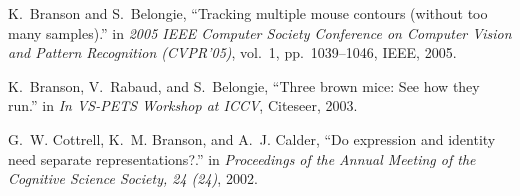 \begin{cvenum}
\item K.~Branson and S.~Belongie, ``Tracking multiple mouse contours (without too
  many samples).'' in {\em 2005 IEEE Computer Society Conference on Computer
  Vision and Pattern Recognition (CVPR'05)}, vol.~1, pp.~1039--1046, IEEE,
  2005.

\item K.~Branson, V.~Rabaud, and S.~Belongie, ``Three brown mice: See how they run.''
  in {\em In VS-PETS Workshop at ICCV}, Citeseer, 2003.

\item G.~W. Cottrell, K.~M. Branson, and A.~J. Calder, ``Do expression and identity
  need separate representations?.'' in {\em Proceedings of the Annual Meeting
  of the Cognitive Science Society, 24 (24)}, 2002.

\end{cvenum}

